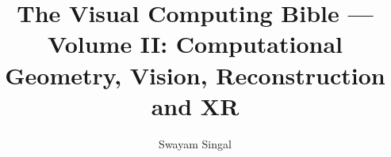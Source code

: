\documentclass[11pt,twoside]{book}
\title{The Visual Computing Bible --- Volume II: Computational Geometry, Vision, Reconstruction and XR}
\author{Swayam Singal}
\begin{document}
\maketitle
\hypertarget{volume-reading-map}{}
\tableofcontents
\mainmatter






















\appendix
\end{document}
